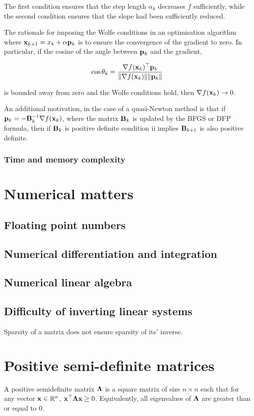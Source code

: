 \documentclass{article}[12pt]
\begin{document}
The first condition ensures that the step length $\alpha_k$ decreases $f$ sufficiently, while the second condition
ensures that the slope had been sufficiently reduced.

The rationale for imposing the Wolfe conditions in an optimisation algorithm where
${\bf x}_{k+1} = x_k + \alpha {\bf p}_k$ is to ensure the convergence of the gradient to zero. In particular, if the
cosine of the angle between ${\bf p}_k$ and the gradient,

$$
\cos \theta_k = \frac{\nabla f({\bf x}_k)^\top {\bf p}_k}{\|\nabla f({\bf x}_k)\| \|{\bf p}_k\|}
$$

is bounded away from zero and the Wolfe conditions hold, then $\nabla f({\bf x}_k) \to 0$.

An additional motivation, in the case of a quasi-Newton method is that if ${\bf p}_k = - {\bf B}_k^{-1} \nabla f({\bf x}_k)$,
where the matrix ${\bf B}_k$ is updated by the BFGS or DFP formula, then if ${\bf B}_k$ is positive definite condition ii
implies ${\bf B}_{k+1}$ is also positive definite.

\subsubsection{Time and memory complexity}

\section{Numerical matters}

\subsection{Floating point numbers}
\subsection{Numerical differentiation and integration}
\subsection{Numerical linear algebra}
\subsection{Difficulty of inverting linear systems}
Sparsity of a matrix does not ensure sparsity of its' inverse.

\section{Positive semi-definite matrices}
A positive semidefinite matrix ${\boldsymbol \Lambda}$ is a square matrix of size $n \times n$ such that for any vector
${\bf x} \in {\mathbb{R}}^n$, ${\bf x}^\top {\boldsymbol\Lambda} {\bf x} \geq 0$. Equivalently, all eigenvalues of ${\boldsymbol \Lambda}$ are greater than or 
equal to 0.
\end{document}
